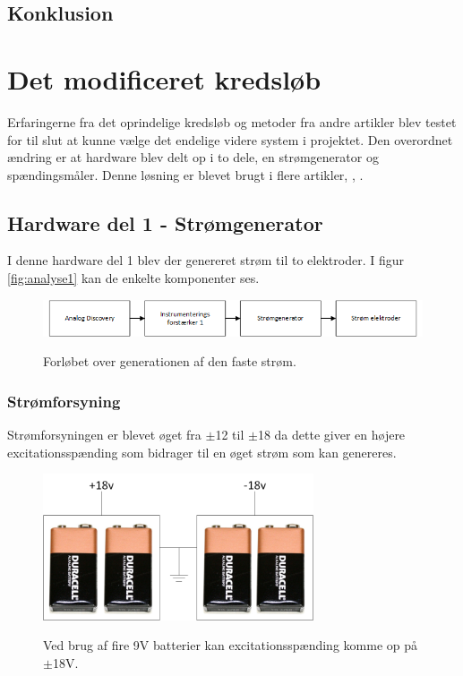 \section{Konklusion}

\chapter{Det modificeret kredsløb}
Erfaringerne fra det oprindelige kredsløb og metoder fra andre artikler blev testet for til slut at kunne vælge det endelige videre system i projektet. Den overordnet ændring er at hardware blev delt op i to dele, en strømgenerator og spændingsmåler. Denne løsning er blevet brugt i flere artikler, \cite{Nahrstaedt2012a}, \cite{Chester}.





\section{Hardware del 1 - Strømgenerator}

I denne hardware del 1 blev der genereret strøm til to elektroder. I figur \ref{fig:analyse1} kan de enkelte komponenter ses.


\begin{figure}[H]
\centering
{\includegraphics[width=\linewidth]
{Figure/analyse1}}
\caption{Forløbet over generationen af den faste strøm.}
\label{analyse1}
\end{figure}

\subsection{Strømforsyning}
Strømforsyningen er blevet øget fra $\pm$12 til $\pm$18 da dette giver en højere excitationsspænding som bidrager til en øget strøm som kan genereres.
\begin{figure}[H]
\centering
{\includegraphics[width=8cm]
{Figure/18v}}
\caption{Ved brug af fire 9V batterier kan excitationsspænding komme op på $\pm$18V.}
\label{fig:18v}
\end{figure}

